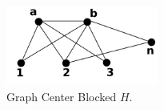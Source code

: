  \begin{figure}[htb]	
 \center%
 \includegraphics[width=5cm]{./img/obstrucaoCentro.png}
 \caption{Graph Center Blocked $H$.}
\label{fig:obstrucaoCentro}
\end{figure}  
 